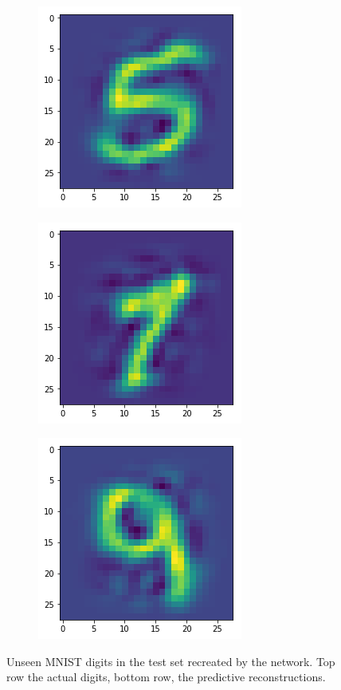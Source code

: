 \begin{figure}[H]
\bigskip
\begin{subfigure}{.3\linewidth}
    \centering
    \includegraphics[scale=0.4]{chapter_3_figures/unseen_test_5.png}
\end{subfigure}
    \hfill
\begin{subfigure}{.3\linewidth}
    \centering
    \includegraphics[scale=0.4]{chapter_3_figures/unseen_test_7.png}
\end{subfigure}
   \hfill
\begin{subfigure}{.3\linewidth}
    \centering
    \includegraphics[scale=0.4]{chapter_3_figures/unseen_test_9.png}
\end{subfigure}
\caption{Unseen MNIST digits in the test set recreated by the network. Top row the actual digits, bottom row, the predictive reconstructions.}
\end{figure}

